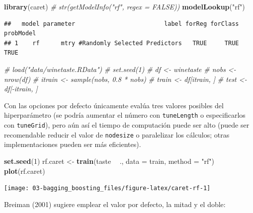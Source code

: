 \documentclass[
]{book}
\newenvironment{Shaded}{\begin{snugshade}}{\end{snugshade}}
\newcommand{\CommentTok}[1]{\textcolor[rgb]{0.56,0.35,0.01}{\textit{#1}}}
\newcommand{\DataTypeTok}[1]{\textcolor[rgb]{0.13,0.29,0.53}{#1}}
\newcommand{\DecValTok}[1]{\textcolor[rgb]{0.00,0.00,0.81}{#1}}
\newcommand{\KeywordTok}[1]{\textcolor[rgb]{0.13,0.29,0.53}{\textbf{#1}}}
\newcommand{\NormalTok}[1]{#1}
\newcommand{\OperatorTok}[1]{\textcolor[rgb]{0.81,0.36,0.00}{\textbf{#1}}}
\newcommand{\StringTok}[1]{\textcolor[rgb]{0.31,0.60,0.02}{#1}}
\theoremstyle{break}
\theoremstyle{definition}
\theoremstyle{definition}
\theoremstyle{definition}
\theoremstyle{remark}
\begin{document}
\begin{Shaded}
\begin{Highlighting}[]
\KeywordTok{library}\NormalTok{(caret)}
\CommentTok{# str(getModelInfo("rf", regex = FALSE))}
\KeywordTok{modelLookup}\NormalTok{(}\StringTok{"rf"}\NormalTok{)}
\end{Highlighting}
\end{Shaded}

\begin{verbatim}
##   model parameter                         label forReg forClass probModel
## 1    rf      mtry #Randomly Selected Predictors   TRUE     TRUE      TRUE
\end{verbatim}

\begin{Shaded}
\begin{Highlighting}[]
\CommentTok{# load("data/winetaste.RData")}
\CommentTok{# set.seed(1)}
\CommentTok{# df <- winetaste}
\CommentTok{# nobs <- nrow(df)}
\CommentTok{# itrain <- sample(nobs, 0.8 * nobs)}
\CommentTok{# train <- df[itrain, ]}
\CommentTok{# test <- df[-itrain, ]}
\end{Highlighting}
\end{Shaded}

Con las opciones por defecto únicamente evalúa tres valores posibles del hiperparámetro (se podría aumentar el número con \texttt{tuneLength} o especificarlos con \texttt{tuneGrid}), pero aún así el tiempo de computación puede ser alto (puede ser recomendable reducir el valor de \texttt{nodesize} o paralelizar los cálculos; otras implementaciones pueden ser más eficientes).

\begin{Shaded}
\begin{Highlighting}[]
\KeywordTok{set.seed}\NormalTok{(}\DecValTok{1}\NormalTok{)}
\NormalTok{rf.caret <-}\StringTok{ }\KeywordTok{train}\NormalTok{(taste }\OperatorTok{~}\StringTok{ }\NormalTok{., }\DataTypeTok{data =}\NormalTok{ train, }\DataTypeTok{method =} \StringTok{"rf"}\NormalTok{)}
\KeywordTok{plot}\NormalTok{(rf.caret)}
\end{Highlighting}
\end{Shaded}

\begin{center}\texttt{[image: 03-bagging\_boosting\_files/figure-latex/caret-rf-1]} \end{center}

Breiman (2001) sugiere emplear el valor por defecto, la mitad y el doble:
\end{document}
